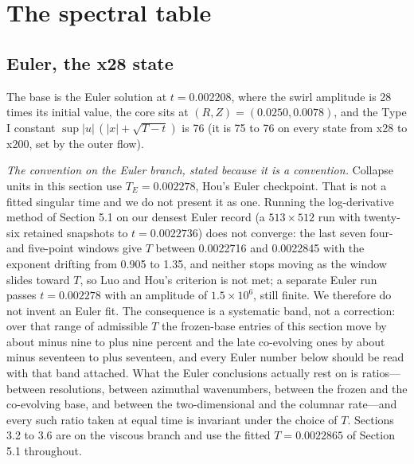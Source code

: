 \documentclass[11pt]{article}
\newcommand{\sn}[2]{#1\times 10^{#2}}
\begin{document}
\section{The spectral table}

\subsection{Euler, the x28 state}

The base is the Euler solution at $t = 0.002208$, where the swirl amplitude is 28 times its initial value, the core sits at $(R, Z) = (0.0250, 0.0078)$, and the Type I constant $\sup |u|\,(|x| + \sqrt{T - t})$ is 76 (it is 75 to 76 on every state from x28 to x200, set by the outer flow).

\emph{The convention on the Euler branch, stated because it is a convention.} Collapse units in this section use $T_E = 0.002278$, Hou's Euler checkpoint. That is not a fitted singular time and we do not present it as one. Running the log-derivative method of Section 5.1 on our densest Euler record (a $513 \times 512$ run with twenty-six retained snapshots to $t = 0.0022736$) does not converge: the last seven four- and five-point windows give $T$ between 0.0022716 and 0.0022845 with the exponent drifting from 0.905 to 1.35, and neither stops moving as the window slides toward $T$, so Luo and Hou's criterion is not met; a separate Euler run passes $t = 0.002278$ with an amplitude of $\sn{1.5}{6}$, still finite. We therefore do not invent an Euler fit. The consequence is a systematic band, not a correction: over that range of admissible $T$ the frozen-base entries of this section move by about minus nine to plus nine percent and the late co-evolving ones by about minus seventeen to plus seventeen, and every Euler number below should be read with that band attached. What the Euler conclusions actually rest on is ratios---between resolutions, between azimuthal wavenumbers, between the frozen and the co-evolving base, and between the two-dimensional and the columnar rate---and every such ratio taken at equal time is invariant under the choice of $T$. Sections 3.2 to 3.6 are on the viscous branch and use the fitted $T = 0.0022865$ of Section 5.1 throughout.
\end{document}
